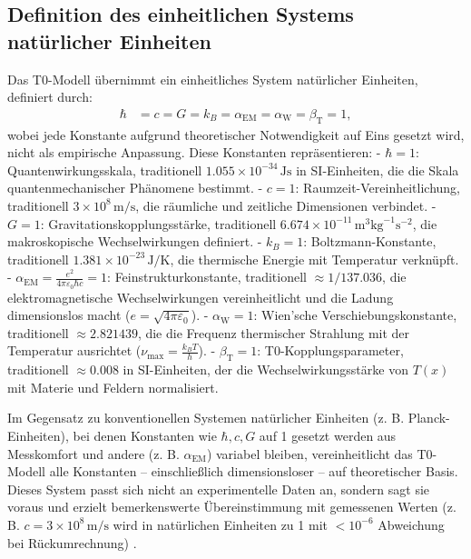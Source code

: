 \documentclass[12pt,a4paper]{article}
\newcommand{\Tfield}{T(x)}
\newcommand{\alphaEM}{\alpha_{\text{EM}}}
\newcommand{\alphaW}{\alpha_{\text{W}}}
\newcommand{\betaT}{\beta_{\text{T}}}
\begin{document}
	\subsection{Definition des einheitlichen Systems natürlicher Einheiten}
	\label{subsec:unified_system}
	
	Das T0-Modell übernimmt ein einheitliches System natürlicher Einheiten, definiert durch:
	\begin{align}
		\hbar &= c = G = k_B = \alphaEM = \alphaW = \betaT = 1,
		\label{eq:unit_system}
	\end{align}
	wobei jede Konstante aufgrund theoretischer Notwendigkeit auf Eins gesetzt wird, nicht als empirische Anpassung. Diese Konstanten repräsentieren:
	- \(\hbar = 1\): Quantenwirkungsskala, traditionell \(1.055 \times 10^{-34} \, \text{Js}\) in SI-Einheiten, die die Skala quantenmechanischer Phänomene bestimmt.
	- \(c = 1\): Raumzeit-Vereinheitlichung, traditionell \(3 \times 10^8 \, \text{m/s}\), die räumliche und zeitliche Dimensionen verbindet.
	- \(G = 1\): Gravitationskopplungsstärke, traditionell \(6.674 \times 10^{-11} \, \text{m}^3\text{kg}^{-1}\text{s}^{-2}\), die makroskopische Wechselwirkungen definiert.
	- \(k_B = 1\): Boltzmann-Konstante, traditionell \(1.381 \times 10^{-23} \, \text{J/K}\), die thermische Energie mit Temperatur verknüpft.
	- \(\alphaEM = \frac{e^2}{4\pi\varepsilon_0\hbar c} = 1\): Feinstrukturkonstante, traditionell \(\approx 1/137.036\), die elektromagnetische Wechselwirkungen vereinheitlicht und die Ladung dimensionslos macht (\(e = \sqrt{4\pi\varepsilon_0}\)).
	- \(\alphaW = 1\): Wien’sche Verschiebungskonstante, traditionell \(\approx 2.821439\), die die Frequenz thermischer Strahlung mit der Temperatur ausrichtet (\(\nu_{\text{max}} = \frac{k_B T}{h}\)).
	- \(\betaT = 1\): T0-Kopplungsparameter, traditionell \(\approx 0.008\) in SI-Einheiten, der die Wechselwirkungsstärke von \(\Tfield\) mit Materie und Feldern normalisiert.
	
	Im Gegensatz zu konventionellen Systemen natürlicher Einheiten (z. B. Planck-Einheiten), bei denen Konstanten wie \(\hbar, c, G\) auf 1 gesetzt werden aus Messkomfort und andere (z. B. \(\alphaEM\)) variabel bleiben, vereinheitlicht das T0-Modell alle Konstanten – einschließlich dimensionsloser – auf theoretischer Basis. Dieses System passt sich nicht an experimentelle Daten an, sondern sagt sie voraus und erzielt bemerkenswerte Übereinstimmung mit gemessenen Werten (z. B. \(c = 3 \times 10^8 \, \text{m/s}\) wird in natürlichen Einheiten zu 1 mit \(< 10^{-6}\) Abweichung bei Rückumrechnung) \cite{pascher_alphabeta_2025}.
	
\end{document}
